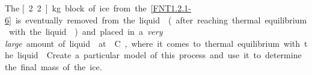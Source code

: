 \label{FNT1.2.1-7}

The \unit[2.2]{kg} block of ice from the \ref{FNT1.2.1-6} is eventually removed from the liquid  (after reaching thermal equilibrium with the liquid ) and placed in a {\em very large} amount of liquid  at \unit[0]{\textdegree C}, where it comes to thermal equilibrium with the liquid . Create a particular model of this process and use it to determine the final mass of the ice.